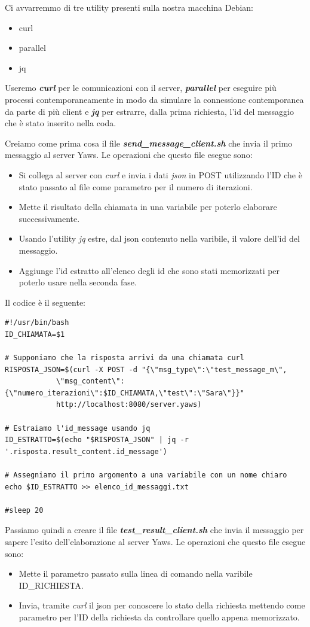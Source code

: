 Ci avvarremmo di tre utility presenti sulla nostra macchina Debian:
\begin{itemize}
	\item curl
	\item parallel
	\item jq
\end{itemize}

Useremo \textbf{\textit{curl}} per le comunicazioni con il server, \textbf{\textit{parallel}} per eseguire pi\`u processi contemporaneamente in modo da simulare la connessione contemporanea da parte di pi\`u client e \textbf{\textit{jq}} per estrarre, dalla prima richiesta, l'id del messaggio che \`e stato inserito nella coda.

Creiamo come prima cosa il file \textit{\textbf{send\_message\_client.sh}} che invia il primo messaggio al server Yaws. Le operazioni che questo file esegue sono:
\begin{itemize}
\item Si collega al server con \textit{curl} e invia i dati \textit{json} in POST utilizzando l'ID che \`e stato passato al file come parametro per il numero di iterazioni. 
\item Mette il risultato della chiamata in una variabile per poterlo elaborare successivamente.
\item Usando l'utility \textit{jq} estre, dal json contenuto nella varibile, il valore dell'id del messaggio.
\item Aggiunge l'id estratto all'elenco degli id che sono stati memorizzati per poterlo usare nella seconda fase.
\end{itemize}

Il codice \`e il seguente:
\begin{verbatim}
#!/usr/bin/bash
ID_CHIAMATA=$1

# Supponiamo che la risposta arrivi da una chiamata curl
RISPOSTA_JSON=$(curl -X POST -d "{\"msg_type\":\"test_message_m\", 
			\"msg_content\": {\"numero_iterazioni\":$ID_CHIAMATA,\"test\":\"Sara\"}}" 
			http://localhost:8080/server.yaws)

# Estraiamo l'id_message usando jq
ID_ESTRATTO=$(echo "$RISPOSTA_JSON" | jq -r '.risposta.result_content.id_message')

# Assegniamo il primo argomento a una variabile con un nome chiaro
echo $ID_ESTRATTO >> elenco_id_messaggi.txt

#sleep 20
\end{verbatim}

Passiamo quindi a creare il file \textit{\textbf{test\_result\_client.sh}} che invia il messaggio per sapere l'esito dell'elaborazione al server Yaws. Le operazioni che questo file esegue sono:
\begin{itemize}
\item Mette il parametro passato sulla linea di comando nella varibile ID\_RICHIESTA.
\item Invia, tramite \textit{curl} il json per conoscere lo stato della richiesta mettendo come parametro per l'ID della richiesta da controllare quello appena memorizzato.
\end{itemize}

